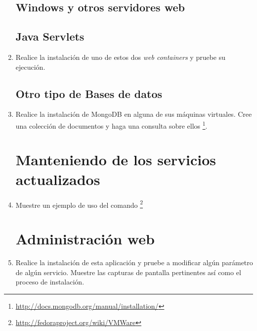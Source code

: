 \documentclass[paper=a4, fontsize=11pt]{scrartcl} %
\numberwithin{equation}{section} %
\numberwithin{figure}{section} %
\numberwithin{table}{section} %
\begin{document}
\begin{enumerate}
	\subsection{Windows y otros servidores web}
	\subsection{Java Servlets}
		\item Realice la instalación de uno de estos dos \textit{web containers} y pruebe su ejecución.
	
	\subsection{Otro tipo de Bases de datos}
		\item Realice la instalación de MongoDB en alguna de sus máquinas virtuales. Cree una colección
		de documentos y haga una consulta sobre ellos
		\footnote{\url{http://docs.mongodb.org/manual/installation/}}.
	
	\section{Manteniendo de los servicios actualizados}
		\item Muestre un ejemplo de uso del comando \footnote{\url{http://fedoraproject.org/wiki/VMWare}}
	
	\section{Administración web}
		\item Realice la instalación de esta aplicación y pruebe a modificar algún parámetro de algún
		servicio. Muestre las capturas de pantalla pertinentes así como el proceso de instalación.
		

\end{enumerate}
\end{document}
